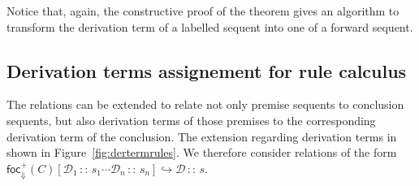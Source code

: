 \documentclass{article}
\theoremstyle{definition}
\newcommand{\frfrel}[1]{\textsf{foc}^+_{\Downarrow}(#1)}
\newcommand{\relj}[3]{#1 [#2] \hookrightarrow #3}
\newcommand{\seqpt}[2]{#1 \, :: \, #2}
\begin{document}
Notice that, again, the constructive proof of the theorem gives an algorithm to
transform the derivation term of a labelled sequent into one of a forward
sequent.

\subsection{Derivation terms assignement for rule calculus}

The relations can be extended to relate not only premise sequents to conclusion
sequents, but also derivation terms of those premises to the corresponding
derivation term of the conclusion. The extension regarding derivation terms in
shown in Figure~\ref{fig:dertermrules}. We therefore consider relations of the
form $\relj{\frfrel{C}}{\seqpt{\mathcal{D}_1}{s_1} \cdots
  \seqpt{\mathcal{D}_n}{s_n}}{\seqpt{\mathcal{D}}{s}}$.
\end{document}
